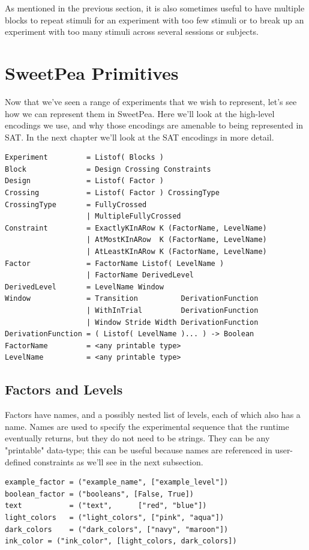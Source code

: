 As mentioned in the previous section, it is also sometimes useful to have multiple blocks to repeat stimuli for an experiment with too few stimuli or to break up an experiment with too many stimuli across several sessions or subjects.

\section{SweetPea Primitives}

Now that we've seen a range of experiments that we wish to represent, let's see how we can represent them in SweetPea. Here we'll look at the high-level encodings we use, and why those encodings are amenable to being represented in SAT. In the next chapter we'll look at the SAT encodings in more detail.


\begin{verbatim}
Experiment         = Listof( Blocks )
Block              = Design Crossing Constraints
Design             = Listof( Factor )
Crossing           = Listof( Factor ) CrossingType
CrossingType       = FullyCrossed
                   | MultipleFullyCrossed
Constraint         = ExactlyKInARow K (FactorName, LevelName)
                   | AtMostKInARow  K (FactorName, LevelName)
                   | AtLeastKInARow K (FactorName, LevelName)
Factor             = FactorName Listof( LevelName )
                   | FactorName DerivedLevel
DerivedLevel       = LevelName Window
Window             = Transition          DerivationFunction
                   | WithInTrial         DerivationFunction
                   | Window Stride Width DerivationFunction
DerivationFunction = ( Listof( LevelName )... ) -> Boolean
FactorName         = <any printable type>
LevelName          = <any printable type>
\end{verbatim}




\subsection{Factors and Levels}
Factors have names, and a possibly nested list of levels, each of which also has a name. Names are used to specify the experimental sequence that the runtime eventually returns, but they do not need to be strings. They can be any "printable" data-type; this can be useful because names are referenced in user-defined constraints as we'll see in the next subsection.

\begin{verbatim}
example_factor = ("example_name", ["example_level"])
boolean_factor = ("booleans", [False, True])
text           = ("text",      ["red", "blue"])
light_colors   = ("light_colors", ["pink", "aqua"])
dark_colors    = ("dark_colors", ["navy", "maroon"])
ink_color = ("ink_color", [light_colors, dark_colors])
\end{verbatim}

